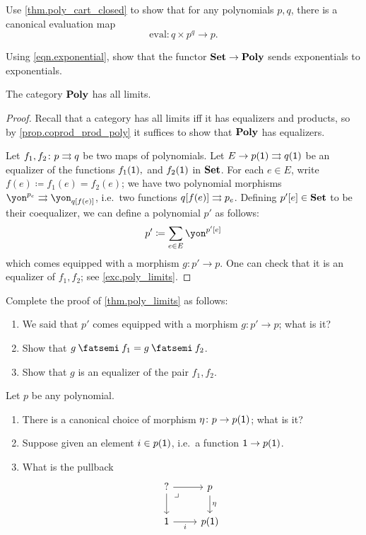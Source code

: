 \documentclass[Book-Poly]{subfiles}
\begin{document}
\begin{exercise}
Use \cref{thm.poly_cart_closed} to show that for any polynomials $p,q$, there is a canonical evaluation map
\begin{equation}\label{eqn.eval_times}
	\text{eval}\colon q\times p^q\to p.
\end{equation}
\end{exercise}


\begin{exercise}
Using \cref{eqn.exponential}, show that the functor $\textbf{Set}\to\textbf{Poly}$ sends exponentials to exponentials.
\end{exercise}

\begin{theorem}\label{thm.poly_limits}
The category $\textbf{Poly}$ has all limits.
\end{theorem}
\begin{proof}
Recall that a category has all limits iff it has equalizers and products, so by \cref{prop.coprod_prod_poly} it suffices to show that $\textbf{Poly}$ has equalizers. 

Let $f_1,f_2\colon p\rightrightarrows q$ be two maps of polynomials. Let $E\to p(\textsf{1})\rightrightarrows q(\textsf{1})$ be an equalizer of the functions $f_1(\textsf{1}),$ and $f_2(\textsf{1})$ in $\textbf{Set}$. For each $e\in E$, write $f(e)\coloneqq f_1(e)=f_2(e)$; we have two polynomial morphisms $\yon^{p_e}\tto\yon_{q[f(e)]}$, i.e.\ two functions $q[f(e)]\rightrightarrows p_e$. Defining $p'[e]\in\textbf{Set}$ to be their coequalizer, we can define a polynomial $p'$ as follows:
\[
  p'\coloneqq\sum_{e\in E}\yon^{p'[e]}
\]
which comes equipped with a morphism $g\colon p'\to p$. One can check that it is an equalizer of $f_1,f_2$; see \cref{exc.poly_limits}.
\end{proof}

\begin{exercise}\label{exc.poly_limits}
Complete the proof of \cref{thm.poly_limits} as follows:
\begin{enumerate}
	\item We said that $p'$ comes equipped with a morphism $g\colon p'\to p$; what is it?
	\item Show that $g\then f_1=g\then f_2$.
	\item Show that $g$ is an equalizer of the pair $f_1,f_2$.
\qedhere
\end{enumerate}
\end{exercise}

\begin{exercise}
Let $p$ be any polynomial.
\begin{enumerate}
	\item There is a canonical choice of morphism $\eta\colon p\to p(\textsf{1})$; what is it?
	\item Suppose given an element $i\in p(\textsf{1})$, i.e.\ a function $\textsf{1}\to p(\textsf{1})$.
	\item What is the pullback
	\[
	\begin{tikzcd}
	?\ar[r]\ar[d]&
	p\ar[d, "\eta"]\\
	\1\ar[r, "i"']&
	p(\1)\ar[ul, phantom, very near end, "\lrcorner"]
	\end{tikzcd}
	\qedhere
	\]
\end{enumerate}
\end{exercise}
\end{document}
